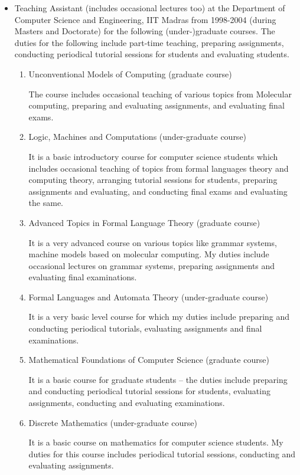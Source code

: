 \documentclass[11pt]{article}
\begin{document}
\begin{itemize}
\item Teaching Assistant (includes occasional lectures too) at the
Department of Computer Science and Engineering, IIT Madras from
1998-2004 (during Masters and Doctorate) for the following
(under-)graduate courses. The duties for the following include
part-time teaching, preparing assignments, conducting periodical
tutorial sessions for students and evaluating students.
\begin{enumerate}
\item Unconventional Models of Computing (graduate course)

The course includes occasional teaching of various topics from
Molecular computing, preparing and evaluating assignments, and
evaluating final exams. 

\item Logic, Machines and Computations (under-graduate course)

It is a basic introductory course for computer science students which
includes occasional teaching of topics from formal languages theory and
computing theory, arranging tutorial sessions for students, preparing
assignments and evaluating, and conducting final exams and evaluating
the same.


\item Advanced Topics in Formal Language Theory (graduate course)

It is a very advanced course on various topics like grammar systems,
machine models based on molecular computing. My duties include
occasional lectures on grammar systems, preparing assignments and
evaluating final examinations.


\item Formal Languages and Automata Theory (under-graduate
  course)

It is a very basic level course for which my duties include preparing
and conducting periodical tutorials, evaluating assignments and final
examinations.


\item Mathematical Foundations of Computer Science (graduate course)

It is a basic course for graduate students -- the duties include
preparing and conducting periodical tutorial sessions for students,
evaluating assignments, conducting and evaluating examinations.

\item Discrete Mathematics (under-graduate course)

It is a basic course on mathematics for computer science students. My
duties for this course includes periodical tutorial sessions,
conducting and evaluating assignments. 

\end{enumerate}
\end{itemize}
\end{document}
